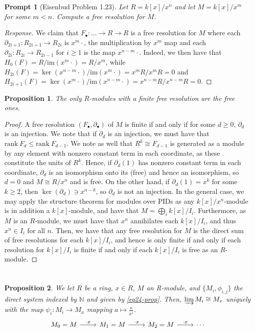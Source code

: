 \documentclass[english]{article}
\newcommand{\NN}{\mathbb{N}}
\newcommand{\prob}[1]{\setcounter{section}{#1-1}\section{}}
\newtheorem*{prop*}{Proposition}
\newtheorem*{prompt*}{Prompt}
\theoremstyle{remark}
\theoremstyle{definition}
\newcommand{\im}{\mathrm{im}}
\newcommand{\rank}{\mathrm{rank}~}
\newcommand{\del}{\partial}
\newcommand{\colim}{\varinjlim}
\begin{document}
\prob{21}\begin{prompt*}[Eisenbud Problem 1.23]
	Let $R=k[x]/x^n$ and let $M=k[x]/x^m$ for some $m<n$. Compute a free resolution for $M$.
\end{prompt*}
\begin{proof}[Response]
	We claim that $F_\bullet : \hdots\to R\to R$ is a free resolution for $M$ where each $\del_{2i+1}:R_{2i+1}\to R_{2i}$ is $x^m\cdot$, the multiplication by $x^m$ map and each $\del_{2i}:R_{2i}\to R_{2i-1}$ for $i\geq 1$ is the map $x^{n-m}\cdot$. Indeed, we then have that $H_0(F)=R/\im(x^m\cdot)=R/x^m$, while $H_{2i}(F)=\ker(x^{n-m}\cdot)/\im(x^m\cdot)=x^mR/x^mR=0$ and $H_{2i+1}(F)=\ker(x^m\cdot)/\im(x^{n-m}\cdot)=x^{n-m}R/x^{n-m}R=0$.
\end{proof}
\begin{prop*}
	The only $R$-modules with a finite free resolution are the free ones.
\end{prop*}
\begin{proof}
 A free resolution $(F_\bullet,\del_\bullet)$ of $M$ is finite if and only if for some $d\geq 0$, $\del_d$ is an injection. We note that if $\del_d$ is an injection, we must have that $\rank F_d\leq \rank F_{d-1}$. We note as well that $R^k\cong F_{d-1}$ is generated as a module by any element with nonzero constant term in each coordinate, as these constitute the units of $R^k$. Hence, if $\del_d(1)$ has nonzero constant term in each coordinate, $\del_d$ is an isomorphism onto its (free)  and hence an isomorphism, so $d=0$ and $M\cong R/x^n$ and is free. On the other hand, if $\del_d(1)=x^k$ for some $k\geq 2$, then $\ker(\del_d)\ni x^{n-k}$, so $\del_d$ is not an injection. In the general case, we may apply the structure theorem for modules over PIDs as any $k[x]/x^n$-module is in addition a $k[x]$-module, and have that $M=\bigoplus_i k[x]/I_i$. Furthermore, as $M$ is an $R$-module, we must have that $x^n$ annihilates each $k[x]/I_i$, and thus $x^n\in I_i$ for all $n$. Then, we have that any free resolution for $M$ is the direct sum of free resolutions for each $k[x]/I_i$, and hence is only finite if and only if each resolution for $k[x]/I_i$ is finite if and only if each $k[x]/I_i$ is free as an $R$-module.    

\end{proof}
\prob{24}
\begin{prop*}
	We let $R$ be a ring, $x\in R$, $M$ an R-module, and $\{M_i,\phi_{i,j}\}$ the direct system indexed by $\NN$ and given by \eqref{eq24-prop}. Then, $\colim M_i\cong M_x$ uniquely with the map $\psi_i:M_i\to M_x$ mapping $a\mapsto \frac{a}{x^i}$. 
	\begin{equation}\label{eq24-prop}\begin{tikzcd}
		M_0=M\arrow[r,"\cdot x"]&M_1=M\arrow[r,"\cdot x"]&M_2=M\arrow[r,"\cdot x"]&\cdots
	\end{tikzcd}\end{equation}
\end{prop*}
\end{document}
